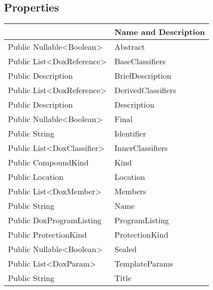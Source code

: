 \documentclass[11pt, oneside, a4paper]{book}
\begin{document}
\subsection{Properties}
\begin{center}
\begin{tabular}{| p{3cm} | p{12cm} | }
\hline
\textbf{ } & \textbf{ Name and Description}\\
\hline
 Public  Nullable<Boolean> &  Abstract\hypertarget{SoftwareEngineeringTools.{}Documentation.{}DoxEnum.{}Abstract}{}\\
\hline
 Public  List<DoxReference> &  BaseClassifiers\hypertarget{SoftwareEngineeringTools.{}Documentation.{}DoxEnum.{}BaseClassifiers}{}\\
\hline
 Public  Description &  BriefDescription\hypertarget{SoftwareEngineeringTools.{}Documentation.{}DoxEnum.{}BriefDescription}{}\\
\hline
 Public  List<DoxReference> &  DerivedClassifiers\hypertarget{SoftwareEngineeringTools.{}Documentation.{}DoxEnum.{}DerivedClassifiers}{}\\
\hline
 Public  Description &  Description\hypertarget{SoftwareEngineeringTools.{}Documentation.{}DoxEnum.{}Description}{}\\
\hline
 Public  Nullable<Boolean> &  Final\hypertarget{SoftwareEngineeringTools.{}Documentation.{}DoxEnum.{}Final}{}\\
\hline
 Public  String &  Identifier\hypertarget{SoftwareEngineeringTools.{}Documentation.{}DoxEnum.{}Identifier}{}\\
\hline
 Public  List<DoxClassifier> &  InnerClassifiers\hypertarget{SoftwareEngineeringTools.{}Documentation.{}DoxEnum.{}InnerClassifiers}{}\\
\hline
 Public  CompoundKind &  Kind\hypertarget{SoftwareEngineeringTools.{}Documentation.{}DoxEnum.{}Kind}{}\\
\hline
 Public  Location &  Location\hypertarget{SoftwareEngineeringTools.{}Documentation.{}DoxEnum.{}Location}{}\\
\hline
 Public  List<DoxMember> &  Members\hypertarget{SoftwareEngineeringTools.{}Documentation.{}DoxEnum.{}Members}{}\\
\hline
 Public  String &  Name\hypertarget{SoftwareEngineeringTools.{}Documentation.{}DoxEnum.{}Name}{}\\
\hline
 Public  DoxProgramListing &  ProgramListing\hypertarget{SoftwareEngineeringTools.{}Documentation.{}DoxEnum.{}ProgramListing}{}\\
\hline
 Public  ProtectionKind &  ProtectionKind\hypertarget{SoftwareEngineeringTools.{}Documentation.{}DoxEnum.{}ProtectionKind}{}\\
\hline
 Public  Nullable<Boolean> &  Sealed\hypertarget{SoftwareEngineeringTools.{}Documentation.{}DoxEnum.{}Sealed}{}\\
\hline
 Public  List<DoxParam> &  TemplateParams\hypertarget{SoftwareEngineeringTools.{}Documentation.{}DoxEnum.{}TemplateParams}{}\\
\hline
 Public  String &  Title\hypertarget{SoftwareEngineeringTools.{}Documentation.{}DoxEnum.{}Title}{}\\
\hline
\end{tabular}
\end{center}
\end{document}

